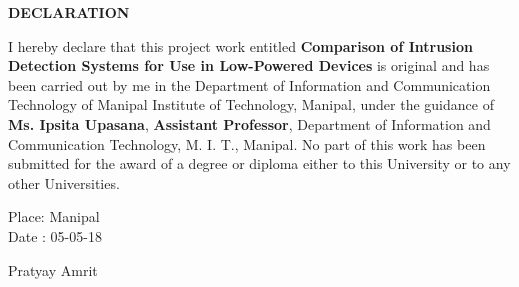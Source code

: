 \begin{center}
\large{\textbf{DECLARATION}}\\
\vspace{1cm}
\end{center}

I hereby declare that this project work entitled \textbf{Comparison of Intrusion Detection Systems for Use in Low-Powered Devices} is original and has been carried out by
me in the Department of Information and Communication Technology of Manipal Institute of Technology, Manipal, under the guidance of \textbf{Ms. Ipsita Upasana}, \textbf{Assistant Professor}, Department of Information and Communication Technology, M. I. T., Manipal. No part of this work has been submitted for the award of a degree or diploma either to this University or to any other Universities.

\vspace{2cm}

\begin{flushleft}
Place: Manipal\\
Date : 05-05-18
\end{flushleft}


\begin{flushright}
Pratyay Amrit
\end{flushright}
